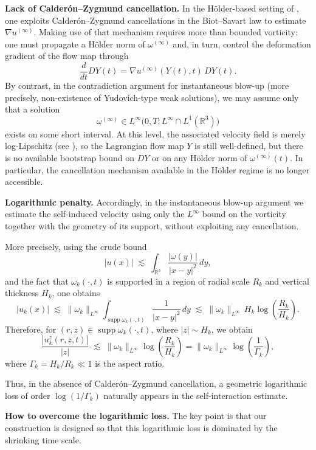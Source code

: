 \documentclass[reqno,11pt]{amsart}
\newcommand{\supp}{\operatorname{supp}}
\begin{document}
\noindent
\textbf{Lack of Calderón--Zygmund cancellation.}
In the Hölder-based setting of \cite{CordobaMartinezZheng25}, one exploits Calderón--Zygmund cancellations in the Biot--Savart law to estimate $\nabla u^{(\infty)}$. Making use of that mechanism requires more than bounded vorticity: one must propagate a Hölder norm of $\omega^{(\infty)}$ and, in turn, control the deformation gradient of the flow map through
\[
\frac{d}{dt} DY(t) = \nabla u^{(\infty)}(Y(t),t)\, DY(t).
\]
By contrast, in the contradiction argument for instantaneous blow-up (more precisely, non-existence of Yudovich-type weak solutions), we may assume only that a solution
\[
\omega^{(\infty)} \in L^\infty\bigl(0,T; L^\infty \cap L^1(\mathbb R^3)\bigr)
\]
exists on some short interval. At this level, the associated velocity field is merely log-Lipschitz (see \cite[Lemma~1]{AzzamBedrossian15}), so the Lagrangian flow map $Y$ is still well-defined, but there is no available bootstrap bound on $DY$ or on any Hölder norm of $\omega^{(\infty)}(t)$. In particular, the cancellation mechanism available in the Hölder regime is no longer accessible.

\medskip

\noindent
\textbf{Logarithmic penalty.}
Accordingly, in the instantaneous blow-up argument we estimate the self-induced velocity using only the $L^\infty$ bound on the vorticity together with the geometry of its support, without exploiting any cancellation.

More precisely, using the crude bound
\[
|u(x)| \;\lesssim\; \int_{\mathbb R^3} \frac{|\omega(y)|}{|x-y|^2}\,dy,
\]
and the fact that $\omega_k(\cdot,t)$ is supported in a region of radial scale $R_k$ and vertical thickness $H_k$, one obtains
\[
|u_k(x)| 
\;\lesssim\;
\|\omega_k\|_{L^\infty}
\int_{\supp \omega_k(\cdot,t)} \frac{1}{|x-y|^2}\,dy
\;\lesssim\;
\|\omega_k\|_{L^\infty}\, H_k \log\!\left(\frac{R_k}{H_k}\right).
\]
Therefore, for $(r,z)\in \supp \omega_k(\cdot,t)$, where $|z| \sim H_k$, we obtain
\[
\frac{|u^{z}_{k}(r,z,t)|}{|z|}
\;\lesssim\;
\|\omega_k \|_{L^\infty}
\log\!\left(\frac{R_k}{H_k}\right)
=
\|\omega_k\|_{L^\infty}
\log\!\left(\frac{1}{\Gamma_k}\right),
\]
where $\Gamma_k = H_k/R_k \ll 1$ is the aspect ratio.

Thus, in the absence of Calderón--Zygmund cancellation, a geometric logarithmic loss of order $\log(1/\Gamma_k)$ naturally appears in the self-interaction estimate.

\medskip

\noindent
\textbf{How to overcome the logarithmic loss.}
The key point is that our construction is designed so that this logarithmic loss is dominated by the shrinking time scale.
\end{document}
